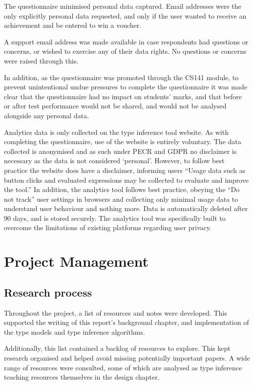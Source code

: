 \documentclass[a4paper,fleqn,oneside,12pt]{report}
\begin{document}
The questionnaire minimised personal data captured. Email addresses were the only explicitly personal data requested, and only if the user wanted to receive an achievement and be entered to win a voucher.

A support email address was made available in case respondents had questions or concerns, or wished to exercise any of their data rights. No questions or concerns were raised through this.

In addition, as the questionnaire was promoted through the CS141 module, to prevent unintentional undue pressures to complete the questionnaire it was made clear that the questionnaire had no impact on students’ marks, and that before or after test performance would not be shared, and would not be analysed alongside any personal data.

Analytics data is only collected on the type inference tool website. As with completing the questionnaire, use of the website is entirely voluntary. The data collected is anonymised and as such under PECR and GDPR no disclaimer is necessary as the data is not considered ‘personal’. However, to follow best practice the website does have a disclaimer, informing users “Usage data such as button clicks and evaluated expressions may be collected to evaluate and improve the tool.” In addition, the analytics tool follows best practice, obeying the “Do not track” user settings in browsers and collecting only minimal usage data to understand user behaviour and nothing more. Data is automatically deleted after 90 days, and is stored securely. The analytics tool was specifically built to overcome the limitations of existing platforms regarding user privacy.

\chapter{Project Management}\label{id:h.3j8xp631ygy}

\section{Research process}\label{id:h.ew85fk610kqt}

Throughout the project, a list of resources and notes were developed. This supported the writing of this report's background chapter, and implementation of the type models and type inference algorithms.

Additionally, this list contained a backlog of resources to explore. This kept research organised and helped avoid missing potentially important papers. A wide range of resources were consulted, some of which are analysed as type inference teaching resources themselves in the design chapter.
\end{document}
